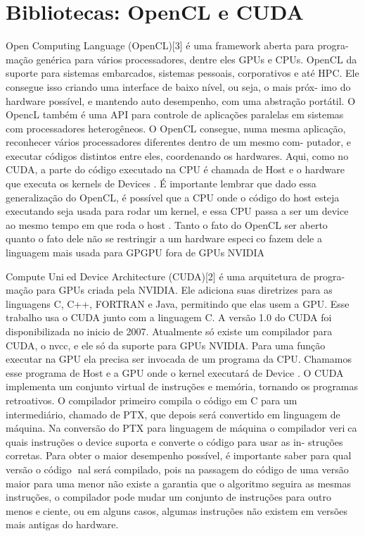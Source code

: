 \section{Bibliotecas: OpenCL e CUDA}
Open Computing Language (OpenCL)[3] é uma framework aberta para progra-
mação genérica para vários processadores, dentre eles GPUs e CPUs. OpenCL
da suporte para sistemas embarcados, sistemas pessoais, corporativos e até HPC.
Ele consegue isso criando uma interface de baixo nível, ou seja, o mais próx-
imo do hardware possível, e mantendo auto desempenho, com uma abstração
portátil. O OpencL também é uma API para controle de aplicações paralelas em
sistemas com processadores heterogêneos. O OpenCL consegue, numa mesma
aplicação, reconhecer vários processadores diferentes dentro de um mesmo com-
putador, e executar códigos distintos entre eles, coordenando os hardwares.
Aqui, como no CUDA, a parte do código executado na CPU é chamada de Host
e o hardware que executa os kernels de Devices . É importante lembrar que
dado essa generalização do OpenCL, é possível que a CPU onde o código do
host esteja executando seja usada para rodar um kernel, e essa CPU passa a ser
um device ao mesmo tempo em que roda o host . Tanto o fato do OpenCL ser
aberto quanto o fato dele não se restringir a um hardware especico fazem dele
a linguagem mais usada para GPGPU fora de GPUs NVIDIA

Compute Unied Device Architecture (CUDA)[2] é uma arquitetura de progra-
mação para GPUs criada pela NVIDIA. Ele adiciona suas diretrizes para as
linguagens C, C++, FORTRAN e Java, permitindo que elas usem a GPU. Esse
trabalho usa o CUDA junto com a linguagem C. A versão 1.0 do CUDA foi
disponibilizada no inicio de 2007. Atualmente só existe um compilador para
CUDA, o nvcc, e ele só da suporte para GPUs NVIDIA.
Para uma função executar na GPU ela precisa ser invocada de um programa
da CPU. Chamamos esse programa de Host e a GPU onde o kernel executará
de Device .
O CUDA implementa um conjunto virtual de instruções e memória, tornando
os programas retroativos. O compilador primeiro compila o código em C para
um intermediário, chamado de PTX, que depois será convertido em linguagem
de máquina. Na conversão do PTX para linguagem de máquina o compilador
verica quais instruções o device suporta e converte o código para usar as in-
struções corretas. Para obter o maior desempenho possível, é importante saber
para qual versão o código nal será compilado, pois na passagem do código de
uma versão maior para uma menor não existe a garantia que o algoritmo seguira
as mesmas instruções, o compilador pode mudar um conjunto de instruções para
outro menos eciente, ou em alguns casos, algumas instruções não existem em
versões mais antigas do hardware.


